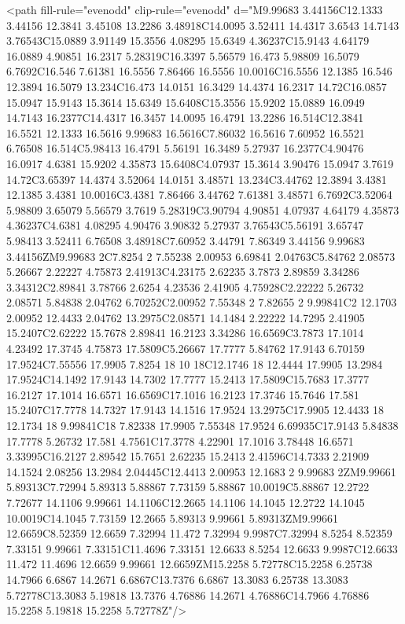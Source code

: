 {{{<path fill-rule="evenodd" clip-rule="evenodd" d="M9.99683 3.44156C12.1333 3.44156 12.3841 3.45108 13.2286 3.48918C14.0095 3.52411 14.4317 3.6543 14.7143 3.76543C15.0889 3.91149 15.3556 4.08295 15.6349 4.36237C15.9143 4.64179 16.0889 4.90851 16.2317 5.28319C16.3397 5.56579 16.473 5.98809 16.5079 6.7692C16.546 7.61381 16.5556 7.86466 16.5556 10.0016C16.5556 12.1385 16.546 12.3894 16.5079 13.234C16.473 14.0151 16.3429 14.4374 16.2317 14.72C16.0857 15.0947 15.9143 15.3614 15.6349 15.6408C15.3556 15.9202 15.0889 16.0949 14.7143 16.2377C14.4317 16.3457 14.0095 16.4791 13.2286 16.514C12.3841 16.5521 12.1333 16.5616 9.99683 16.5616C7.86032 16.5616 7.60952 16.5521 6.76508 16.514C5.98413 16.4791 5.56191 16.3489 5.27937 16.2377C4.90476 16.0917 4.6381 15.9202 4.35873 15.6408C4.07937 15.3614 3.90476 15.0947 3.7619 14.72C3.65397 14.4374 3.52064 14.0151 3.48571 13.234C3.44762 12.3894 3.4381 12.1385 3.4381 10.0016C3.4381 7.86466 3.44762 7.61381 3.48571 6.7692C3.52064 5.98809 3.65079 5.56579 3.7619 5.28319C3.90794 4.90851 4.07937 4.64179 4.35873 4.36237C4.6381 4.08295 4.90476 3.90832 5.27937 3.76543C5.56191 3.65747 5.98413 3.52411 6.76508 3.48918C7.60952 3.44791 7.86349 3.44156 9.99683 3.44156ZM9.99683 2C7.8254 2 7.55238 2.00953 6.69841 2.04763C5.84762 2.08573 5.26667 2.22227 4.75873 2.41913C4.23175 2.62235 3.7873 2.89859 3.34286 3.34312C2.89841 3.78766 2.6254 4.23536 2.41905 4.75928C2.22222 5.26732 2.08571 5.84838 2.04762 6.70252C2.00952 7.55348 2 7.82655 2 9.99841C2 12.1703 2.00952 12.4433 2.04762 13.2975C2.08571 14.1484 2.22222 14.7295 2.41905 15.2407C2.62222 15.7678 2.89841 16.2123 3.34286 16.6569C3.7873 17.1014 4.23492 17.3745 4.75873 17.5809C5.26667 17.7777 5.84762 17.9143 6.70159 17.9524C7.55556 17.9905 7.8254 18 10 18C12.1746 18 12.4444 17.9905 13.2984 17.9524C14.1492 17.9143 14.7302 17.7777 15.2413 17.5809C15.7683 17.3777 16.2127 17.1014 16.6571 16.6569C17.1016 16.2123 17.3746 15.7646 17.581 15.2407C17.7778 14.7327 17.9143 14.1516 17.9524 13.2975C17.9905 12.4433 18 12.1734 18 9.99841C18 7.82338 17.9905 7.55348 17.9524 6.69935C17.9143 5.84838 17.7778 5.26732 17.581 4.7561C17.3778 4.22901 17.1016 3.78448 16.6571 3.33995C16.2127 2.89542 15.7651 2.62235 15.2413 2.41596C14.7333 2.21909 14.1524 2.08256 13.2984 2.04445C12.4413 2.00953 12.1683 2 9.99683 2ZM9.99661 5.89313C7.72994 5.89313 5.88867 7.73159 5.88867 10.0019C5.88867 12.2722 7.72677 14.1106 9.99661 14.1106C12.2665 14.1106 14.1045 12.2722 14.1045 10.0019C14.1045 7.73159 12.2665 5.89313 9.99661 5.89313ZM9.99661 12.6659C8.52359 12.6659 7.32994 11.472 7.32994 9.9987C7.32994 8.5254 8.52359 7.33151 9.99661 7.33151C11.4696 7.33151 12.6633 8.5254 12.6633 9.9987C12.6633 11.472 11.4696 12.6659 9.99661 12.6659ZM15.2258 5.72778C15.2258 6.25738 14.7966 6.6867 14.2671 6.6867C13.7376 6.6867 13.3083 6.25738 13.3083 5.72778C13.3083 5.19818 13.7376 4.76886 14.2671 4.76886C14.7966 4.76886 15.2258 5.19818 15.2258 5.72778Z"/>
}}}
